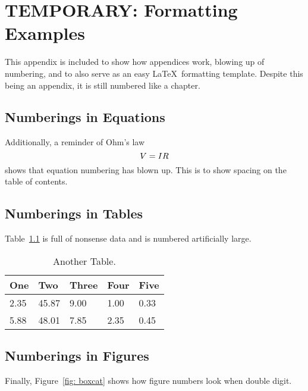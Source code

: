 \chapter{TEMPORARY: Formatting Examples}


\setcounter{figure}{66}
\setcounter{table}{13}
\setcounter{equation}{41}
This appendix is included to show how appendices work, blowing up of numbering, and to also serve as an easy \LaTeX\ formatting template. Despite this being an appendix, it is still numbered like a chapter.

\section{Numberings in Equations}
Additionally, a reminder of Ohm's law
\begin{equation}{\label{eq:ohms law} }
V = IR
\end{equation} %
\noindent shows that equation numbering has blown up. This is to show spacing on the table of contents.
 
\section{Numberings in Tables}
Table~\ref{tab:exp2} is full of nonsense data and is numbered artificially large.

\begin{table}[!ht] %
	\centering
	\begin{tabular}{@{} lllll @{}} 	
		\toprule %
		\footnotesize %
		One& Two  & Three  & Four  & Five  \\
		\midrule		
		2.35& 45.87  & 9.00  & 1.00  &0.33  \\
		5.88& 48.01  & 7.85  & 2.35  & 0.45 \\
		\bottomrule
	\end{tabular}
	\caption{Another Table.}
	\label{tab:exp2}
\end{table}

\section{Numberings in Figures}
Finally, Figure~\ref{fig: boxcat} shows how figure numbers look when double digit.


